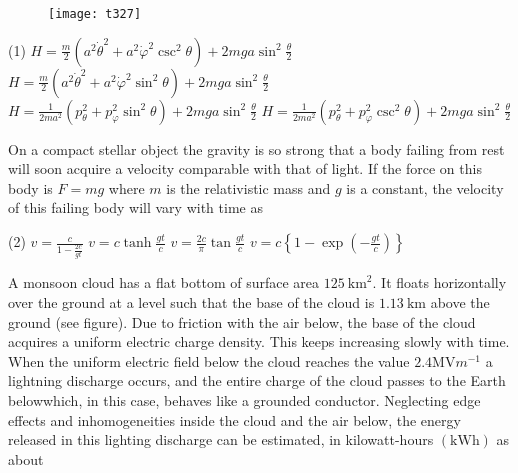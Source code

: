 \begin{questions}
\begin{minipage}{\textwidth}
\end{minipage}
\begin{figure}[H]
	\centering
	\texttt{[image: t327]}
\end{figure}
\begin{tasks}(1)
	\task[\textbf{A.}]   $H=\frac{m}{2}\left(a^{2} \dot{\theta}^{2}+a^{2} \dot{\varphi}^{2} \csc ^{2} \theta\right)+2 m g a \sin ^{2} \frac{\theta}{2}$
	\task[\textbf{B.}] $H=\frac{m}{2}\left(a^{2} \dot{\theta}^{2}+a^{2} \dot{\varphi}^{2} \sin ^{2} \theta\right)+2 m g a \sin ^{2} \frac{\theta}{2}$
	\task[\textbf{C.}]   $H=\frac{1}{2 m a^{2}}\left(p_{\theta}^{2}+p_{\varphi}^{2} \sin ^{2} \theta\right)+2 m g a \sin ^{2} \frac{\theta}{2}$
	\task[\textbf{D.}] $H=\frac{1}{2 m a^{2}}\left(p_{\theta}^{2}+p_{\varphi}^{2} \csc ^{2} \theta\right)+2 m g a \sin ^{2} \frac{\theta}{2}$
\end{tasks}
\begin{minipage}{\textwidth}
	\question On a compact stellar object the gravity is so strong that a body failing from rest will soon acquire a velocity comparable with that of light. If the force on this body is $F=m g$ where $m$ is the relativistic mass and $g$ is a constant, the velocity of this failing body will vary with time as
\end{minipage}
\begin{tasks}(2)
	\task[\textbf{A.}] $v=\frac{c}{1-\frac{2 c}{g t}}$
	\task[\textbf{B.}]   $v=c \tanh \frac{g t}{c}$
	\task[\textbf{C.}] $v=\frac{2 c}{\pi} \tan \frac{g t}{c}$
	\task[\textbf{D.}] $v=c\left\{1-\exp \left(-\frac{g t}{c}\right)\right\}$
\end{tasks}
\begin{minipage}{\textwidth}
	\question A monsoon cloud has a flat bottom of surface area $125 \mathrm{~km}^{2}$. It floats horizontally over the ground at a level such that the base of the cloud is $1.13 \mathrm{~km}$ above the ground (see figure). Due to friction with the air below, the base of the cloud acquires a uniform electric charge density. This keeps increasing slowly with time.
	When the uniform electric field below the cloud reaches the value $2.4 \mathrm{MV} m^{-1}$ a lightning discharge occurs, and the entire charge of the cloud passes to the Earth belowwhich, in this case, behaves like a grounded conductor. Neglecting edge effects and inhomogeneities inside the cloud and the air below, the energy released in this lighting discharge can be estimated, in kilowatt-hours $(\mathrm{kWh})$ as about

\end{minipage}
\end{questions}
